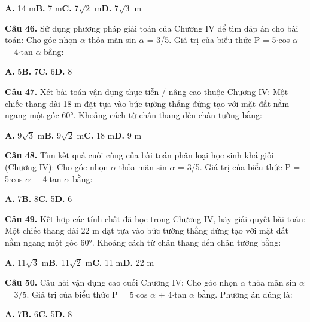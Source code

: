 \documentclass[11pt,a4paper]{article}
\begin{document}
\hspace*{1.5em}\textbf{A.} 14 m\quad\quad \textbf{B.} 7 m\quad\quad \textbf{C.} 7$\sqrt{2}$ m\quad\quad \textbf{D.} 7$\sqrt{3}$ m\par\vspace{2pt}
\textbf{\color{primary} Câu 46.} Sử dụng phương pháp giải toán của Chương IV để tìm đáp án cho bài toán: Cho góc nhọn $\alpha$ thỏa mãn sin $\alpha$ = 3/5. Giá trị của biểu thức P = 5$\cdot$cos $\alpha$ + 4$\cdot$tan $\alpha$ bằng:\par
\hspace*{1.5em}\textbf{A.} 5\quad\quad \textbf{B.} 7\quad\quad \textbf{C.} 6\quad\quad \textbf{D.} 8\par\vspace{2pt}
\textbf{\color{primary} Câu 47.} Xét bài toán vận dụng thực tiễn / nâng cao thuộc Chương IV: Một chiếc thang dài 18 m đặt tựa vào bức tường thẳng đứng tạo với mặt đất nằm ngang một góc 60°. Khoảng cách từ chân thang đến chân tường bằng:\par
\hspace*{1.5em}\textbf{A.} 9$\sqrt{3}$ m\quad\quad \textbf{B.} 9$\sqrt{2}$ m\quad\quad \textbf{C.} 18 m\quad\quad \textbf{D.} 9 m\par\vspace{2pt}
\textbf{\color{primary} Câu 48.} Tìm kết quả cuối cùng của bài toán phân loại học sinh khá giỏi (Chương IV): Cho góc nhọn $\alpha$ thỏa mãn sin $\alpha$ = 3/5. Giá trị của biểu thức P = 5$\cdot$cos $\alpha$ + 4$\cdot$tan $\alpha$ bằng:\par
\hspace*{1.5em}\textbf{A.} 7\quad\quad \textbf{B.} 8\quad\quad \textbf{C.} 5\quad\quad \textbf{D.} 6\par\vspace{2pt}
\textbf{\color{primary} Câu 49.} Kết hợp các tính chất đã học trong Chương IV, hãy giải quyết bài toán: Một chiếc thang dài 22 m đặt tựa vào bức tường thẳng đứng tạo với mặt đất nằm ngang một góc 60°. Khoảng cách từ chân thang đến chân tường bằng:\par
\hspace*{1.5em}\textbf{A.} 11$\sqrt{3}$ m\quad\quad \textbf{B.} 11$\sqrt{2}$ m\quad\quad \textbf{C.} 11 m\quad\quad \textbf{D.} 22 m\par\vspace{2pt}
\textbf{\color{primary} Câu 50.} Câu hỏi vận dụng cao cuối Chương IV: Cho góc nhọn $\alpha$ thỏa mãn sin $\alpha$ = 3/5. Giá trị của biểu thức P = 5$\cdot$cos $\alpha$ + 4$\cdot$tan $\alpha$ bằng. Phương án đúng là:\par
\hspace*{1.5em}\textbf{A.} 7\quad\quad \textbf{B.} 6\quad\quad \textbf{C.} 5\quad\quad \textbf{D.} 8\par\vspace{2pt}
\end{document}
